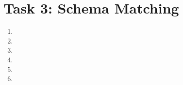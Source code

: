 \documentclass{scrartcl}
\begin{document}
	\section*{Task 3: Schema Matching}
	\begin{enumerate}
		\item
		
		\item
		
		\item
		
		\item
		
		\item
		
		\item
		
	\end{enumerate}
\end{document}
